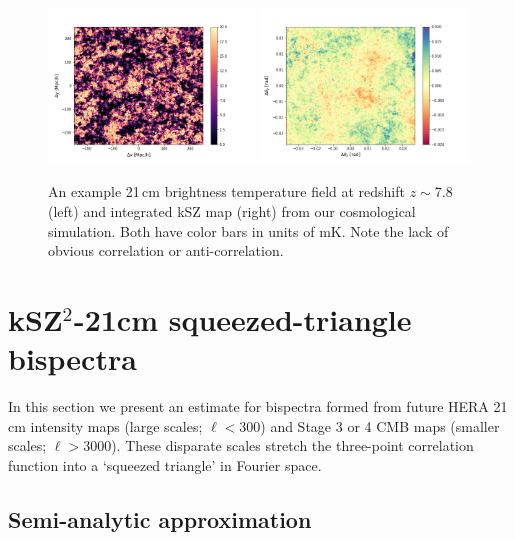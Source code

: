 \begin{figure}
\centering
\includegraphics[width=0.49\textwidth]{chapters/ksz_21cm/figures/21cmExample_z7p8.png}
\includegraphics[width=0.49\textwidth]{chapters/ksz_21cm/figures/kszmap.png}
\caption[An example 21\,cm brightness temperature field and integrated kSZ map from our cosmological simulation.]{An example 21\,cm brightness temperature field at redshift $z\sim$7.8 (left) and integrated kSZ map (right) from our cosmological simulation. Both have color bars in units of mK. Note the lack of obvious correlation or anti-correlation.}
\label{fig:ksz_21cm_sim_example}
\end{figure}

\section{kSZ$^2$-21cm squeezed-triangle bispectra}
\label{sec:bispec}

In this section we present an estimate for bispectra formed from future HERA 21\,cm intensity maps (large scales; $\ell < 300$) and Stage 3 or 4 CMB maps (smaller scales; $\ell > 3000$). These disparate scales stretch the three-point correlation function into a `squeezed triangle' in Fourier space.

\subsection{Semi-analytic approximation}
\label{subsec:ksz_21cm_semi_analytic_approximation}

